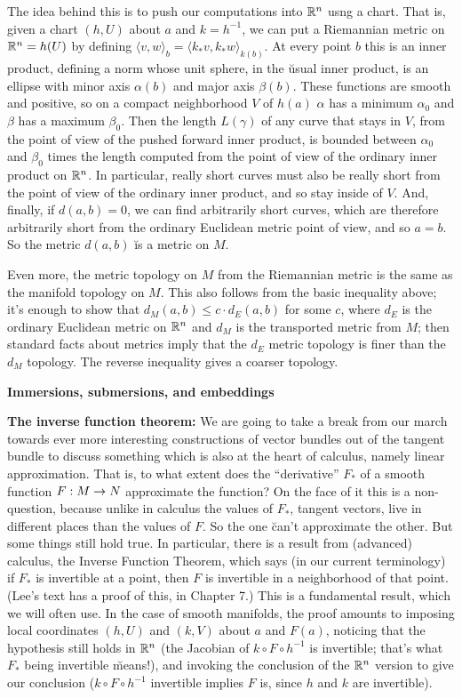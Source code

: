 The idea behind this is to push our computations into ${\Bbb R}^n$ usng a chart. That is,
given a chart $(h,U)$ about $a$ and $k=h^{-1}$, we can put a Riemannian metric on ${\Bbb R}^n=h(U)$ by
defining $\langle v,w\rangle_b=\langle k_*v,k_*w\rangle_{k(b)}$. At every point $b$ this is 
an inner product, defining a norm whose unit sphere, in the \u{usual} inner product,
is an ellipse with minor axis $\alpha(b)$ and major axis $\beta(b)$. These functions are
smooth and positive, so on a compact neighborhood $V$ of $h(a)$ $\alpha$ has a minimum
$\alpha_0$ and $\beta$ has a maximum $\beta_0$. Then the length $L(\gamma)$ of any curve that 
stays in $V$, from the point of view of the pushed forward inner product, is bounded 
between $\alpha_0$ and $\beta_0$ times the length computed from the point of view of the 
ordinary inner product on ${\Bbb R}^n$. In particular, really short curves must also be really short
from the point of view of the ordinary inner product, and so stay inside of $V$. And, finally,
if $d(a,b)=0$, we can find arbitrarily short curves, which are therefore arbitrarily short from 
the ordinary Euclidean metric point of view, and so $a=b$. So the metric $d(a,b)$ \u{is}
a metric on $M$.

Even more, the metric topology on $M$ from the Riemannian metric is the same as the manifold
topology on $M$. This also follows from the basic inequality above; it's enough to show that
$d_M(a,b)\leq c\cdot d_E(a,b)$ for some $c$, where $d_E$ is the ordinary Euclidean metric
on ${\Bbb R}^n$ and $d_M$ is the transported metric from $M$; then standard facts about
metrics imply that the $d_E$ metric topology is finer than the $d_M$ topology. The reverse
inequality gives a coarser topology.

\msk

{\bf Immersions, submersions, and embeddings} 

\msk

{\bf The inverse function theorem:} We are going to take a break from our
march towards ever more interesting constructions of vector bundles out of the tangent
bundle to discuss something which is also at the heart of calculus, namely linear
approximation. That is, to what extent does the 
``derivative'' $F_*$ of a smooth function $F:M\rightarrow N$ approximate the function?
On the face of it this is a non-question, because unlike in calculus
the values of $F_*$, tangent vectors, live in different places than the values of $F$.
So the one \u{can't} approximate the other. But some things still hold true. In 
particular, there is a result from (advanced) calculus, the Inverse Function Theorem,
which says (in our current terminology) if $F_*$ is invertible at a point, then
$F$ is invertible in a neighborhood of that point. (Lee's text has a proof of this,
in Chapter 7.) This is a fundamental result,
which we will often use. In the case of smooth manifolds, the proof amounts to 
imposing local coordinates $(h,U)$ and $(k,V)$ about $a$ and $F(a)$, noticing 
that the hypothesis still holds in ${\Bbb R}^n$ (the Jacobian of
$k\circ F\circ h^{-1}$ is invertible; that's what $F_*$ being invertible \u{means}!),
and invoking the conclusion of the ${\Bbb R}^n$ version to give our conclusion
($k\circ F\circ h^{-1}$ invertible implies $F$ is, since $h$ and $k$ are
invertible). 

